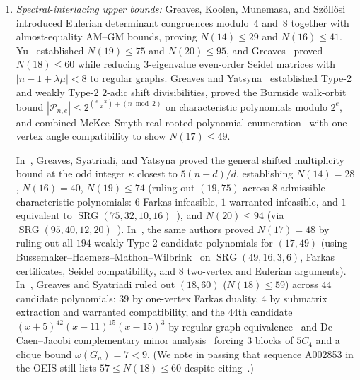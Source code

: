 \documentclass[11pt,reqno]{amsart}
\theoremstyle{definition}
\theoremstyle{remark}
\numberwithin{equation}{section}
\numberwithin{table}{section}
\DeclareMathOperator{\SRG}{SRG}
\begin{document}
\begin{enumerate}
  \item \emph{Spectral-interlacing upper bounds:}
  Greaves, Koolen, Munemasa, and Sz\"oll\H{o}si~\cite{GKMS2016} introduced Eulerian determinant congruences modulo~$4$ and~$8$ together with almost-equality AM--GM bounds, proving $N(14) \le 29$ and $N(16) \le 41$. Yu~\cite{Yu2015} established $N(19) \le 75$ and $N(20) \le 95$, and Greaves~\cite{Greaves2018} proved $N(18) \le 60$ while reducing $3$-eigenvalue even-order Seidel matrices with $|n - 1 + \lambda\mu| < 8$ to regular graphs. Greaves and Yatsyna~\cite{GY2019} established Type-2 and weakly Type-2 $2$-adic shift divisibilities, proved the Burnside walk-orbit bound $|\mathcal{P}_{n,e}| \le 2^{\binom{e-2}{2} + (n \bmod 2)}$ on characteristic polynomials modulo $2^e$, and combined McKee--Smyth real-rooted polynomial enumeration~\cite{McKeeSmyth2004} with one-vertex angle compatibility to show $N(17) \le 49$.

  In~\cite{GSY2021}, Greaves, Syatriadi, and Yatsyna proved the general shifted multiplicity bound at the odd integer $\kappa$ closest to $5(n-d)/d$, establishing $N(14)=28$, $N(16)=40$, $N(19) \le 74$ (ruling out $(19, 75)$ across $8$ admissible characteristic polynomials: $6$ Farkas-infeasible, $1$ warranted-infeasible, and $1$ equivalent to $\SRG(75, 32, 10, 16)$~\cite{AzarijaMarc2018}), and $N(20) \le 94$ (via $\SRG(95, 40, 12, 20)$~\cite{AzarijaMarc2020}). In~\cite{GSY2023}, the same authors proved $N(17) = 48$ by ruling out all $194$ weakly Type-2 candidate polynomials for $(17, 49)$ (using Bussemaker--Haemers--Mathon--Wilbrink~\cite{BHMW1989} on $\SRG(49, 16, 3, 6)$, Farkas certificates, Seidel compatibility, and $8$ two-vertex and Eulerian arguments). In~\cite{GS2024}, Greaves and Syatriadi ruled out $(18, 60)$ ($N(18) \le 59$) across $44$ candidate polynomials: $39$ by one-vertex Farkas duality, $4$ by submatrix extraction and warranted compatibility, and the $44$th candidate $(x+5)^{42}(x-11)^{15}(x-15)^3$ by regular-graph equivalence~\cite{Greaves2018} and De Caen--Jacobi complementary minor analysis~\cite{DeCaen2000} forcing $3$ blocks of $5C_4$ and a clique bound $\omega(G_u) = 7 < 9$. (We note in passing that sequence A002853 in the OEIS still lists $57 \le N(18) \le 60$ despite citing~\cite{GS2024}.)


\end{enumerate}
\end{document}
